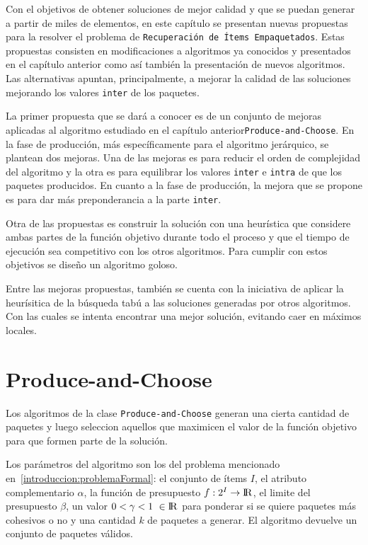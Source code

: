 Con el objetivos de obtener soluciones de mejor calidad y que se puedan generar a partir de miles de elementos, en este capítulo se presentan nuevas propuestas para la resolver el problema de \texttt{Recuperación de Ítems Empaquetados}. Estas propuestas consisten en modificaciones a algoritmos ya conocidos y presentados en el capítulo anterior como así también la presentación de nuevos algoritmos. Las alternativas apuntan, principalmente, a mejorar la calidad de las soluciones mejorando los valores \texttt{inter} de los paquetes.

La primer propuesta que se dará a conocer es de un conjunto de mejoras aplicadas al algoritmo estudiado en el capítulo anterior\texttt{Produce\allowbreak-and\allowbreak-Choose}. En la fase de producción, más específicamente para el algoritmo jerárquico, se plantean dos mejoras. Una de las mejoras es para reducir el orden de complejidad del algoritmo y la otra es para equilibrar los valores \texttt{inter} e \texttt{intra} de que los paquetes producidos. En cuanto a la fase de producción, la mejora que se propone es para dar más preponderancia a la parte \texttt{inter}.

Otra de las propuestas es construir la solución con una heurística que considere ambas partes de la función objetivo durante todo el proceso y que el tiempo de ejecución sea competitivo con los otros algoritmos. Para cumplir con estos objetivos se diseño un algoritmo goloso.

Entre las mejoras propuestas, también se cuenta con la iniciativa de aplicar la heurísitica de la búsqueda tabú a las soluciones generadas por otros algoritmos. Con las cuales se intenta encontrar una mejor solución, evitando caer en máximos locales. 

\section{Produce-and-Choose}
Los algoritmos de la clase \texttt{Produce\allowbreak-and\allowbreak-Choose} generan una cierta cantidad de paquetes y luego seleccion aquellos que maximicen el valor de la función objetivo para que formen parte de la solución.

Los parámetros del algoritmo son los del problema mencionado en~\autoref{introduccion:problemaFormal}: el conjunto de ítems $I$, el atributo complementario $\alpha$, la función de presupuesto $f: 2^{I} \rightarrow \rm I \!R$, el limite del presupuesto $\beta$, un valor $0 < \gamma < 1\ \in \rm I \!R$ para ponderar si se quiere paquetes más cohesivos o no y una cantidad $k$ de paquetes a generar. El algoritmo devuelve un conjunto de paquetes válidos.

